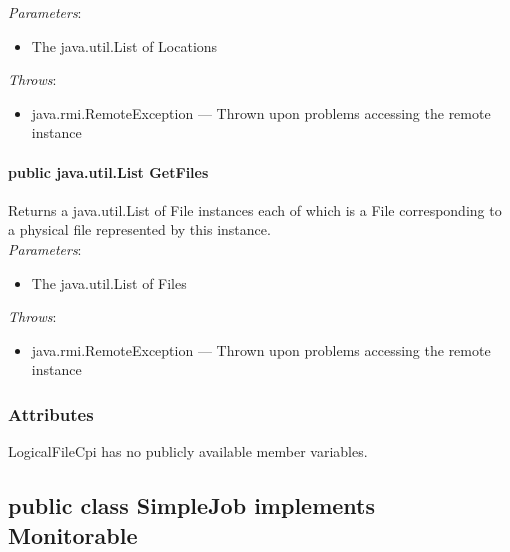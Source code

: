 \documentclass[$Date: 2003/06/26 19:29:31 $]{glabarticle}
\begin{document}
\textit{Parameters}:
\begin{itemize}
\item[] The java.util.List of Locations
\end{itemize}

 \textit{Throws}:
 \begin{itemize}
 \item[] java.rmi.RemoteException --- Thrown upon problems accessing the remote instance 
 \end{itemize}

\paragraph{public java.util.List GetFiles}

Returns a java.util.List of File instances each of which is a File corresponding
to a physical file represented by this instance.  \\

\textit{Parameters}:
\begin{itemize}
\item[] The java.util.List of Files
\end{itemize}

 \textit{Throws}:
 \begin{itemize}
 \item[] java.rmi.RemoteException --- Thrown upon problems accessing the remote instance 
 \end{itemize}



\subsubsection{Attributes}

LogicalFileCpi has no publicly available member variables. 


\newpage

\subsection{public class SimpleJob implements Monitorable}

\end{document}
